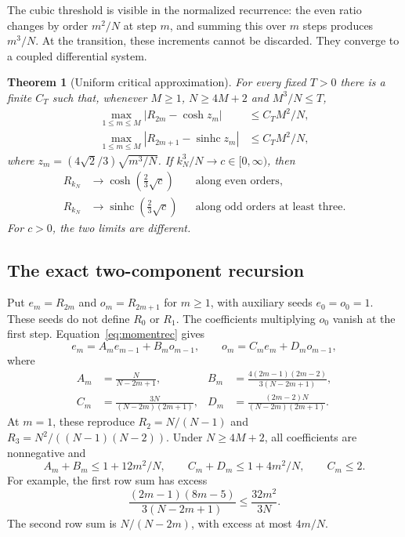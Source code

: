 \documentclass[11pt]{article}
\newtheorem{theorem}{Theorem}[section]
\theoremstyle{definition}
\theoremstyle{remark}
\newcommand{\1}{\mathbf 1}
\newcommand{\shc}{\operatorname{sinhc}}
\begin{document}
The cubic threshold is visible in the normalized recurrence: the even ratio changes by order $m^2/N$ at step $m$, and summing this over $m$ steps produces $m^3/N$. At the transition, these increments cannot be discarded. They converge to a coupled differential system.

\begin{theorem}[Uniform critical approximation]\label{thm:critical}
For every fixed $T>0$ there is a finite $C_T$ such that, whenever $M\ge1$, $N\ge4M+2$ and $M^3/N\le T$,
\begin{align}
\max_{1\le m\le M}\left|R_{2m}-\cosh z_m\right|&\le C_T M^2/N,\label{eq:criticeven}\\
\max_{1\le m\le M}\left|R_{2m+1}-\shc z_m\right|&\le C_T M^2/N,\label{eq:criticodd}
\end{align}
where $z_m=(4\sqrt2/3)\sqrt{m^3/N}$. If $k_N^3/N\to c\in[0,\infty)$, then
\begin{align*}
R_{k_N}&\longrightarrow\cosh\left(\frac23\sqrt c\right)
&&\text{along even orders},\\
R_{k_N}&\longrightarrow\shc\left(\frac23\sqrt c\right)
&&\text{along odd orders at least three}.
\end{align*}
For $c>0$, the two limits are different.
\end{theorem}

\subsection{The exact two-component recursion}

Put $e_m=R_{2m}$ and $o_m=R_{2m+1}$ for $m\ge1$, with auxiliary seeds $e_0=o_0=1$. These seeds do not define $R_0$ or $R_1$. The coefficients multiplying $o_0$ vanish at the first step. Equation~\eqref{eq:momentrec} gives
\begin{equation}\label{eq:tworec}
e_m=A_me_{m-1}+B_mo_{m-1},\qquad
o_m=C_me_m+D_mo_{m-1},
\end{equation}
where
\begin{align*}
A_m&=\frac N{N-2m+1},&
B_m&=\frac{4(2m-1)(2m-2)}{3(N-2m+1)},\\
C_m&=\frac{3N}{(N-2m)(2m+1)},&
D_m&=\frac{(2m-2)N}{(N-2m)(2m+1)}.
\end{align*}
At $m=1$, these reproduce $R_2=N/(N-1)$ and $R_3=N^2/((N-1)(N-2))$. Under $N\ge4M+2$, all coefficients are nonnegative and
\begin{equation}\label{eq:rowsums}
A_m+B_m\le1+12m^2/N,\qquad
C_m+D_m\le1+4m^2/N,\qquad C_m\le2.
\end{equation}
For example, the first row sum has excess
\[
\frac{(2m-1)(8m-5)}{3(N-2m+1)}\le\frac{32m^2}{3N}.
\]
The second row sum is $N/(N-2m)$, with excess at most $4m/N$.
\end{document}
